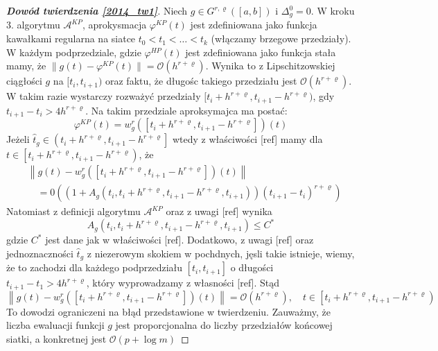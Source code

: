 \documentclass[oik, pdftex, robocza, man]{mgrwms}
\begin{document}
    \begin{proof}[\textbf{Dowód twierdzenia \eqref{2014_tw1}}]
        Niech $g \in G^{r, \varrho}([a,b])$ i $\Delta_{g}^{0} = 0$. W kroku 3. algorytmu $\mathcal{A}^{KP}$, aprokysmacja $\varphi^{KP}(t)$ jest zdefiniowana jako funkcja kawałkami regularna na siatce $t_{0} < t_{1} < \ldots < t_{k}$ (włączamy brzegowe przedziały). W każdym podprzedziale, gdzie $\varphi^{HP}(t)$ jest zdefiniowana jako funkcja stała mamy, że $\|g(t) - \varphi^{KP}(t)\| = \mathcal{O}(h^{r+\varrho})$. Wynika to z Lipschitzowskiej ciągłości $g$ na $[t_{i}, t_{i+1})$ oraz faktu, że długośc takiego przedziału jest $\mathcal{O}(h^{r+\varrho})$.
        W takim razie wystarczy rozważyć przedziały $[t_{i} + h^{r+\varrho}, t_{i+1} - h^{r+\varrho})$, gdy $t_{i+1}-t_{i} > 4h^{r+\varrho}$. Na takim przedziale aproksymajca ma postać:
        \begin{equation*}
            \varphi^{KP}(t)=w_{g}^{r}\left(\left[t_{i}+h^{r+\varrho}, t_{i+1}-h^{r+\varrho}\right]\right)(t)            
        \end{equation*}
        Jeżeli $\hat{t}_{g} \in\left(t_{i}+h^{r+\varrho}, t_{i+1}-h^{r+\varrho}\right]$ wtedy z właściwości [ref] mamy dla $t \in\left[t_{i}+h^{r+\varrho}, t_{i+1}-h^{r+\varrho}\right)$, że
        \begin{equation*}
            \begin{aligned}
                &\left\|g(t)-w_{g}^{r}\left(\left[t_{i}+h^{r+\varrho}, t_{i+1}-h^{r+\varrho}\right]\right)(t)\right\| \\
                &\quad=0\left(\left(1+A_{g}\left(t_{i}, t_{i}+h^{r+\varrho}, t_{i+1}-h^{r+\varrho}, t_{i+1}\right)\right)\left(t_{i+1}-t_{i}\right)^{r+\varrho}\right)
            \end{aligned}                            
        \end{equation*}
        Natomiast z definicji algorytmu $\mathcal{A}^{KP}$ oraz z uwagi [ref] wynika
        \begin{equation*}
            A_{g}\left(t_{i}, t_{i}+h^{r+\varrho}, t_{i+1}-h^{r+\varrho}, t_{i+1}\right) \leq C^{*}
        \end{equation*}
        gdzie $C^{*}$ jest dane jak w właściwości [ref]. Dodatkowo, z uwagi [ref] oraz jednoznaczności $\hat{t}_{g}$ z niezerowym skokiem w pochdnych, jęsli takie istnieje, wiemy, że to zachodzi dla każdego podprzedziału $[t_{i}, t_{i+1}]$ o długości $t_{i+1} - t_{1} > 4h^{r+\varrho}$, który wyprowadzamy z własności [ref].
        Stąd
        \begin{equation*}
            \left\|g(t)-w_{g}^{r}\left(\left[t_{i}+h^{r+\varrho}, t_{i+1}-h^{r+\varrho}\right]\right)(t)\right\|=\mathcal{O}\left(h^{r+\varrho}\right), \quad t \in\left[t_{i}+h^{r+\varrho}, t_{i+1}-h^{r+\varrho}\right)
        \end{equation*}
        To dowodzi ograniczeni na błąd przedstawione w twierdzeniu. Zauważmy, że liczba ewaluacji funkcji $g$ jest proporcjonalna do liczby przedziałów końcowej siatki, a konkretnej jest $\mathcal{O}(p + \log m)$

    \end{proof}
\end{document}
